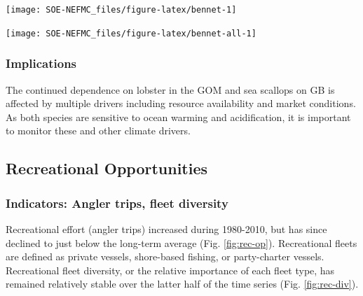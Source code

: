 \documentclass[
  10pt,
]{article}
\let\origfigure\figure
\let\endorigfigure\endfigure
\renewenvironment{figure}[1][2] {
    \expandafter\origfigure\expandafter[H]
} {
    \endorigfigure
}
\begin{document}
\begin{figure}

{\centering \texttt{[image: SOE-NEFMC\_files/figure-latex/bennet-1]} 

}

\caption{Revenue change from the 1982 baseline in 2023 dollars (black), price, and volume for commercial landings from Georges Bank (GB: left) and the Gulf of Maine (GOM: right)}\label{fig:bennet}
\end{figure}

\begin{figure}

{\centering \texttt{[image: SOE-NEFMC\_files/figure-latex/bennet-all-1]} 

}

\caption{Revenue change from the long-term mean in 2023 dollars (black), price, and volume for commercial landings from Georges Bank (GB: top panels) and the Gulf of Maine (GOM: bottom panels)}\label{fig:bennet-all}
\end{figure}

\hypertarget{implications-1}{%
\subsubsection{Implications}\label{implications-1}}

The continued dependence on lobster in the GOM and sea scallops on GB is affected by multiple drivers including resource availability and market conditions. As both species are sensitive to ocean warming and acidification, it is important to monitor these and other climate drivers.

\hypertarget{recreational-opportunities}{%
\subsection{Recreational Opportunities}\label{recreational-opportunities}}

\hypertarget{indicators-angler-trips-fleet-diversity}{%
\subsubsection{Indicators: Angler trips, fleet diversity}\label{indicators-angler-trips-fleet-diversity}}

Recreational effort (angler trips) increased during 1980-2010, but has since declined to just below the long-term average (Fig. \ref{fig:rec-op}). Recreational fleets are defined as private vessels, shore-based fishing, or party-charter vessels. Recreational fleet diversity, or the relative importance of each fleet type, has remained relatively stable over the latter half of the time series (Fig. \ref{fig:rec-div}).
\end{document}
